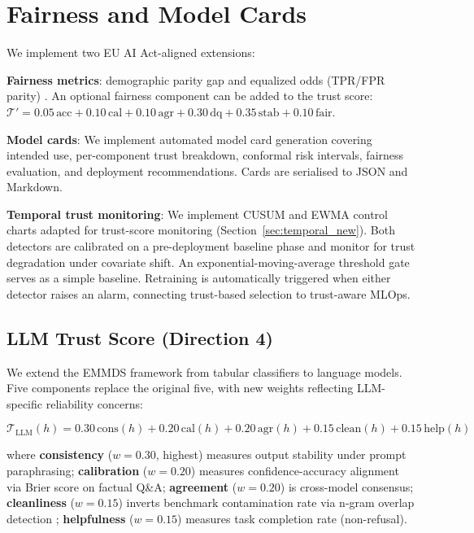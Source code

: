 \documentclass[10pt]{article}
\newcommand{\trust}{\mathcal{T}}
\begin{document}
\section{Fairness and Model Cards}
\label{sec:fairness}

We implement two EU AI Act-aligned extensions:

\textbf{Fairness metrics}: demographic parity gap and equalized odds (TPR/FPR parity) \citep{hardt2016equality}. An optional fairness component can be added to the trust score: $\trust' = 0.05\,\text{acc} + 0.10\,\text{cal} + 0.10\,\text{agr} + 0.30\,\text{dq} + 0.35\,\text{stab} + 0.10\,\text{fair}$.

\textbf{Model cards}: We implement automated model card generation \citep{mitchell2019model} covering intended use, per-component trust breakdown, conformal risk intervals, fairness evaluation, and deployment recommendations. Cards are serialised to JSON and Markdown.

\textbf{Temporal trust monitoring}: We implement CUSUM and EWMA control charts adapted for trust-score monitoring (Section~\ref{sec:temporal_new}). Both detectors are calibrated on a pre-deployment baseline phase and monitor for trust degradation under covariate shift. An exponential-moving-average threshold gate serves as a simple baseline. Retraining is automatically triggered when either detector raises an alarm, connecting trust-based selection to trust-aware MLOps.

\subsection{LLM Trust Score (Direction 4)}

We extend the EMMDS framework from tabular classifiers to language models. Five components replace the original five, with new weights reflecting LLM-specific reliability concerns:

\begin{equation}
\trust_\text{LLM}(h) = 0.30\,\text{cons}(h) + 0.20\,\text{cal}(h) + 0.20\,\text{agr}(h) + 0.15\,\text{clean}(h) + 0.15\,\text{help}(h)
\end{equation}

where \textbf{consistency} ($w{=}0.30$, highest) measures output stability under prompt paraphrasing; \textbf{calibration} ($w{=}0.20$) measures confidence-accuracy alignment via Brier score on factual Q\&A; \textbf{agreement} ($w{=}0.20$) is cross-model consensus; \textbf{cleanliness} ($w{=}0.15$) inverts benchmark contamination rate via n-gram overlap detection \citep{magar2022data}; \textbf{helpfulness} ($w{=}0.15$) measures task completion rate (non-refusal).
\end{document}
